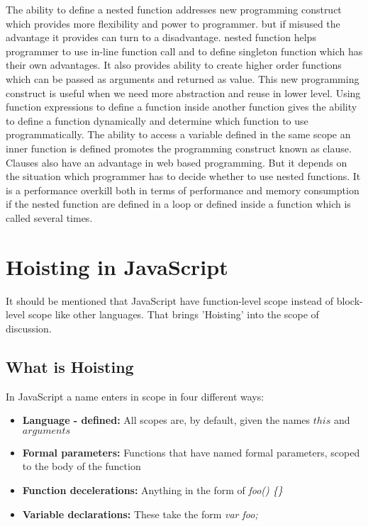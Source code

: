 \documentclass[accentcolor=tud0b,12pt,paper=a4]{tudreport}
\begin{document}
The ability to define a nested function addresses new programming construct which provides more flexibility and power to programmer. but if misused the advantage it provides can turn to a disadvantage. nested function helps programmer to use in-line function call and to define singleton function which has their own advantages. It also provides ability to create higher order functions which can be passed as arguments and returned as value. This new programming construct is useful when we need more abstraction and reuse in lower level. Using function expressions to define a
function inside another function gives the ability to define a function dynamically and determine which function to use programmatically. The ability to access a variable defined in the same scope
an inner function is defined promotes the programming construct known as clause. Clauses also have an advantage in web based programming. But it depends on the situation which programmer has to decide whether to use nested functions. It is a performance overkill both in terms of performance and memory consumption if the nested function are defined in a loop or defined inside a function
which is called several times.


\chapter{Hoisting in JavaScript}
It should be mentioned that JavaScript have function-level scope instead of block-level scope like other languages. That brings 'Hoisting' into the scope of discussion.

\section{What is Hoisting}

In JavaScript a name enters in scope in four different ways:
\begin{itemize}
	\item \textbf{Language - defined:} All scopes are, by default, given the names $this$ and $arguments$
	\item \textbf{Formal parameters:} Functions that have named formal parameters, scoped to the body of the function
	\item \textbf{Function decelerations:} Anything in the form of \emph{foo() \{\}}
	\item \textbf{Variable declarations:} These take the form \emph{var foo;}
\end{itemize}
\end{document}
